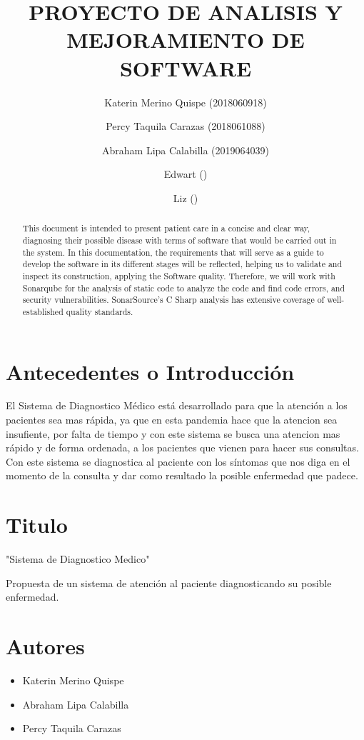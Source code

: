 \documentclass[preprint,12pt]{elsarticle}
\begin{document}
	
	\begin{frontmatter}

		\title{\huge  PROYECTO DE  ANALISIS Y  MEJORAMIENTO DE  SOFTWARE }
		\author{Katerin Merino Quispe              (2018060918)}
		\author{Percy Taquila Carazas             (2018061088)}
		\author{Abraham Lipa Calabilla (2019064039)}
		\author{Edwart                ()}
		\author{Liz                ()}
		\address{Tacna, Perú}
		


\begin{abstract}
This document is intended to present patient care in a concise and clear way, diagnosing their possible disease with terms of software that would be carried out in the system. In this documentation, the requirements that will serve as a guide to develop the software in its different stages will be reflected, helping us to validate and inspect its construction, applying the Software quality.
Therefore, we will work with Sonarqube for the analysis of static code to analyze the code and find code errors, and security vulnerabilities. SonarSource's C Sharp analysis has extensive coverage of well-established quality standards.  
\end{abstract}


\end{frontmatter}
\section{Antecedentes o Introducción}

El Sistema de Diagnostico Médico está desarrollado para que la atención a los pacientes sea mas rápida, ya que en esta pandemia hace que la atencion sea insufiente, por falta de tiempo y con este sistema se busca una atencion mas rápido y de forma ordenada, a los pacientes que vienen para hacer sus consultas. Con este sistema se diagnostica al paciente con los síntomas que nos diga en el momento de la consulta y dar como resultado la posible enfermedad que padece.

\section{Titulo}
"Sistema de Diagnostico Medico"

Propuesta de un sistema de atención al paciente diagnosticando su posible enfermedad.
\section{Autores}
\begin{itemize}
    \item Katerin Merino Quispe
    \item Abraham Lipa Calabilla
    \item Percy Taquila Carazas
    
\end{itemize}
\end{document}
